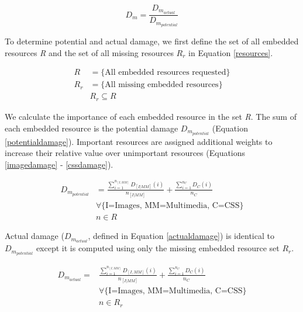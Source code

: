 \begin{equation}
\label{damageeqn}
D_m = \frac{D_{m_{actual}}}{D_{m_{potential}}}
\end{equation}

To determine potential and actual damage, we first define the set of all embedded resources \emph{R} and the set of all missing resources \emph{$R_r$} in Equation \ref{resources}.

\begin{equation}
\label{resources}
\begin{split}
R &= \{\text{All embedded resources requested}\}\\
R_r &= \{\text{All missing embedded resources}\}\\
&R_r \subseteq R
\end{split}
\end{equation}

We calculate the importance of each embedded resource in the set \emph{R}. The sum of each embedded resource is the potential damage \emph{$D_{m_{potential}}$} (Equation \ref{potentialdamage}). Important resources are assigned additional weights to increase their relative value over unimportant resources (Equations \ref{imagedamage} - \ref{cssdamage}).

\begin{equation}
\label{potentialdamage}
\begin{split}
D_{m_{potential}}& = \frac{\sum_{i=1}^{n_{[I,MM]}} D_{[I|MM]}(i)}{n_{[I|MM]}} +\frac{\sum_{i=1}^{n_C} D_C(i)}{n_C} %
\\&\forall\{\text{I=Images, MM=Multimedia, C=CSS}\}\\& n \in R
\end{split}
\end{equation}

Actual damage ($D_{m_{actual}}$, defined in Equation \ref{actualdamage}) is identical to $D_{m_{potential}}$ except it is computed using only the missing embedded resource set \emph{$R_r$}. %

\begin{equation}
\label{actualdamage}
\begin{split}
D_{m_{actual}} =& \frac{\sum_{i=1}^{n_{[I,MM]}} D_{[I,MM]}(i)}{n_{[I|MM]}} + \frac{\sum_{i=1}^{n_C} D_C(i)}{n_C} %
\\&\forall\{\text{I=Images, MM=Multimedia, C=CSS}\} \\&n \in R_r
\end{split}
\end{equation}



